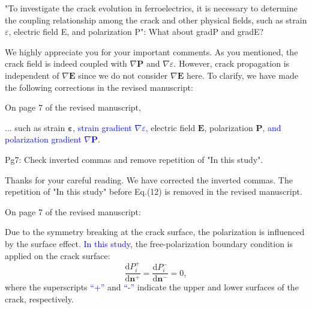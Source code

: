 \documentclass[12pt,fleqn]{article}
\begin{document}
\begin{question}{}
    "To investigate the crack evolution in ferroelectrics, it is necessary to determine the coupling relationship among the crack and other physical fields, such as strain $\varepsilon$, electric field E, and polarization P": What about gradP and gradE?
\end{question}
\begin{response}
    We highly appreciate you for your important comments. As you mentioned, the crack field is indeed coupled with $\nabla \mathbf{P}$ and $\nabla \varepsilon$. However, crack propagation is independent of $\nabla \mathbf{E}$ since we do not consider $\nabla \mathbf{E}$ here. To clarify, we have made the following corrections in the revised manuscript:

    On page 7 of the revised manuscript,
    \begin{revised}
        ... such as strain $\mathbf{\varepsilon}$, \textcolor{blue}{strain gradient $\nabla \varepsilon$,} electric field $\mathbf{E}$, polarization $\mathbf{P}$, \textcolor{blue}{and polarization gradient $\nabla \mathbf{P}$}. 
    \end{revised}
\end{response}

\begin{question}{}
    Pg7: Check inverted commas and remove repetition of "In this study".
\end{question}
\begin{response}
    Thanks for your careful reading. We have corrected the inverted commas. The repetition of "In this study" before Eq.(12) is removed in the revised manuscript. 

    On page 7 of the revised manuscript:
    \setcounter{equation}{11}
    \begin{revised}
        Due to the symmetry breaking at the crack surface, the polarization is influenced by the surface effect. \textcolor{blue}{In this study}, the free-polarization boundary condition is applied on the crack surface:
        \begin{equation}
            \frac{\mathrm{d}P_i^+}{\mathrm{d}\mathbf{n}^+}=\frac{\mathrm{d}P_i^-}{\mathrm{d}\mathrm{\mathbf{n}^-}}=0,
        \end{equation}
        where the superscripts \textcolor{blue}{``+''} and \textcolor{blue}{``-''} indicate the upper and lower surfaces of the crack, respectively.
    \end{revised}
\end{response}
\end{document}
